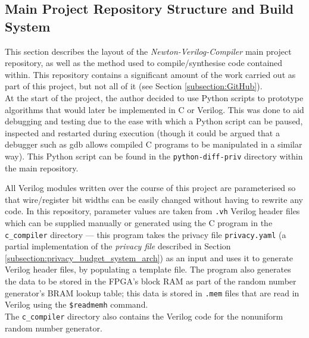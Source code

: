 \documentclass[12pt]{article}
\begin{document}
  \subsection{Main Project Repository Structure and Build System} \label{subsection:build_system}
    This section describes the layout of the \textit{Newton-Verilog-Compiler} main project repository, as well as the method used to compile/synthesise code contained within. This repository contains a significant amount of the work carried out as part of this project, but not all of it (see Section \ref{subsection:GitHub}).\\

    At the start of the project, the author decided to use Python scripts to prototype algorithms that would later be implemented in C or Verilog. This was done to aid debugging and testing due to the ease with which a Python script can be paused, inspected and restarted during execution (though it could be argued that a debugger such as gdb allows compiled C programs to be manipulated in a similar way). This Python script can be found in the \texttt{python-diff-priv} directory within the main repository.

    All Verilog modules written over the course of this project are parameterised so that wire/register bit widths can be easily changed without having to rewrite any code. In this repository, parameter values are taken from \texttt{.vh} Verilog header files which can be supplied manually or generated using the C program in the \texttt{c\_compiler} directory --- this program takes the privacy file \texttt{privacy.yaml} (a partial implementation of the \textit{privacy file} described in Section \ref{subsection:privacy_budget_system_arch}) as an input and uses it to generate Verilog header files, by populating a template file. The program also generates the data to be stored in the FPGA's block RAM as part of the random number generator's BRAM lookup table; this data is stored in \texttt{.mem} files that are read in Verilog using the \texttt{\$readmemh} command.\\

    The \texttt{c\_compiler} directory also contains the Verilog code for the nonuniform random number generator.\\
\end{document}
